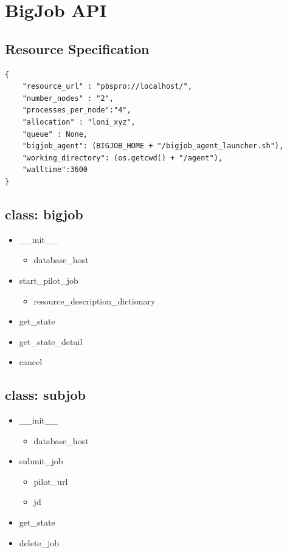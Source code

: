 \documentclass[]{article}
\begin{document}
\section{BigJob API}
\label{sec:api}
\subsection{Resource Specification}


\begin{verbatim}
{
    "resource_url" : "pbspro://localhost/", 
    "number_nodes" : "2", 
    "processes_per_node":"4", 
    "allocation" : "loni_xyz", 
    "queue" : None, 
    "bigjob_agent": (BIGJOB_HOME + "/bigjob_agent_launcher.sh"), 
    "working_directory": (os.getcwd() + "/agent"), 
    "walltime":3600 
}
\end{verbatim}


\subsection{class: bigjob}


\begin{itemize}
	\item \_\_init\_\_
		\begin{itemize}
			\item database\_host
		\end{itemize}
	\item start\_pilot\_job
	\begin{itemize}
	   \item resource\_description\_dictionary
	\end{itemize}	
	\item get\_state	
	\item get\_state\_detail
	\item cancel
\end{itemize}

\subsection{class: subjob}
\begin{itemize}
\item \_\_init\_\_
		\begin{itemize}
			\item database\_host
		\end{itemize}
	\item submit\_job
	\begin{itemize}
		\item pilot\_url
		\item jd
	\end{itemize}

	\item get\_state

	\item delete\_job
\end{itemize}



\end{document}
